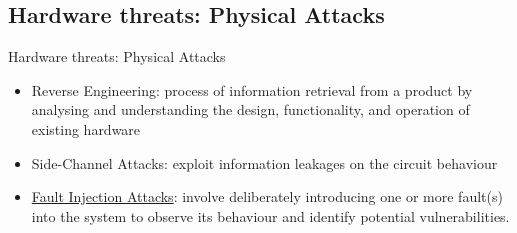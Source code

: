 \subsection{Hardware threats: Physical Attacks}
\begin{frame}{Hardware threats: Physical Attacks}
    \begin{block}{}
        \begin{itemize}
            [square]
            \justifying
            \item<1> Reverse Engineering: process of information retrieval from a product by analysing and understanding the design, functionality, and operation of existing hardware
            \item<2> Side-Channel Attacks: exploit information leakages on the circuit behaviour
            \item<3> \underline{Fault Injection Attacks}: involve deliberately introducing one or more fault(s) into the system to observe its behaviour and identify potential vulnerabilities.
        \end{itemize}
    \end{block}



\end{frame}
